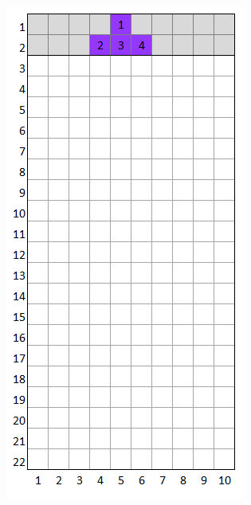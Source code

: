 \documentclass[a4paper]{article}
\begin{document}
	\begin{minipage}{0.33\textwidth}
		\centering
		\includegraphics[scale=0.4]{resources/img/minoes/mino_purple}
		\label{fig:mino-purple}
	\end{minipage}%
\end{document}
